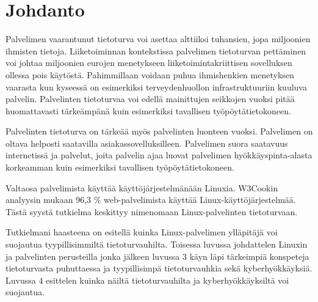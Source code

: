 \chapter{Johdanto}\label{Johdanto}

    Palvelimen vaarantunut tietoturva voi asettaa alttiiksi tuhansien, jopa miljoonien ihmisten tietoja. Liiketoiminnan kontekstissa palvelimen tietoturvan pettäminen voi johtaa miljoonien eurojen menetykseen liiketoimintakriittisen sovelluksen ollessa pois käytöstä. Pahimmillaan voidaan puhua ihmishenkien menetyksen vaarasta kun kyseessä on esimerkiksi terveydenhuollon infrastruktuuriin kuuluva palvelin. Palvelinten tietoturvaa voi edellä mainittujen seikkojen vuoksi pitää huomattavasti tärkeämpänä kuin esimerkiksi tavallisen työpöytätietokoneen.

    Palvelinten tietoturva on tärkeää myös palvelinten luonteen vuoksi. Palvelimen on oltava helposti saatavilla asiakassovelluksilleen. Palvelimen suora saatavuus internetissä ja palvelut, joita palvelin ajaa luovat palvelimen hyökkäyspinta-alasta korkeamman kuin esimerkiksi tavallisen työpöytätietokoneen.

    Valtaosa palvelimista käyttää käyttöjärjestelmänään Linuxia. W3Cookin analyysin mukaan 96,3 \% web-palvelimista käyttää Linux-käyttöjärjestelmää\cite{w3cook}. Tästä syystä tutkielma keskittyy nimenomaan Linux-palvelinten tietoturvaan.

    Tutkielmani haasteena on esitellä kuinka Linux-palvelimen ylläpitäjä voi suojautua tyypillisimmiltä tietoturvauhilta. Toisessa luvussa johdattelen Linuxin ja palvelinten perusteilla jonka jälkeen luvussa 3 käyn läpi tärkeimpiä konspeteja tietoturvasta puhuttaessa ja tyypillisimpä tietoturvauhkia sekä kyberhyökkäyksiä. Luvussa 4 esittelen kuinka näiltä tietoturvauhilta ja kyberhyökkäyksiltä voi suojautua.
